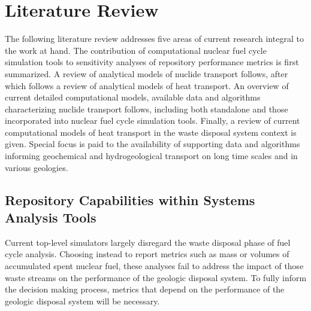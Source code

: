 \chapter{Literature Review}\label{ch:litrev}

The following literature review addresses five areas of current research
integral to the work at hand. The contribution of computational nuclear fuel
cycle simulation tools to sensitivity analyses of repository performance
metrics is first summarized. A review of analytical models of nuclide transport
follows, after which follows a review of analytical models of heat transport.
An overview of current detailed computational models, available data and
algorithms characterizing nuclide transport follows, including both standalone
and those incorporated into nuclear fuel cycle simulation tools. Finally, a
review of current computational models of heat transport in the waste disposal
system context is given.  Special focus is paid to the availability of
supporting data and algorithms informing geochemical and hydrogeological
transport on long time scales and in various geologies. 

\section{Repository Capabilities within Systems Analysis Tools}
\label{sec:SA_repos}



Current top-level simulators largely disregard the waste disposal phase of fuel
cycle analysis. Choosing instead to report metrics such as mass or volumes of
accumulated spent nuclear fuel, these analyses fail to address the impact of
those waste streams on the performance of the geologic disposal system. 
\cite{wilson_comparing_2011}  To fully inform the decision making process, 
metrics that depend on the performance of the geologic disposal system will be
necessary. 

